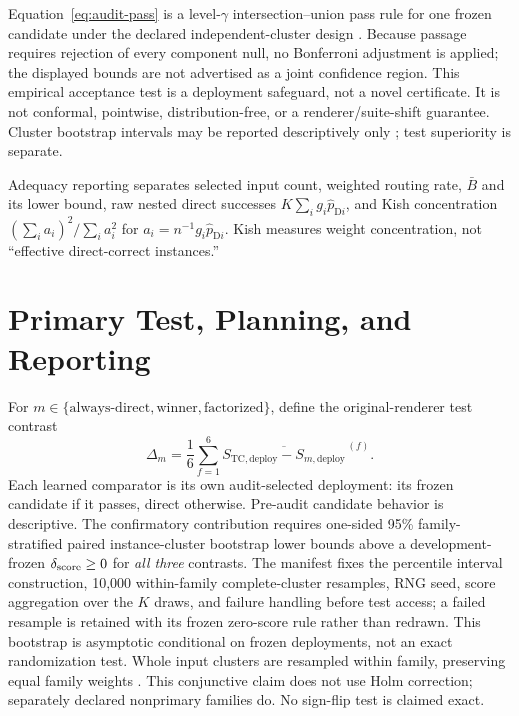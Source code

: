 \documentclass{article}
\newcommand{\D}{\ensuremath{\mathrm{D}}}
\newcommand{\1}{\mathbb{I}}
\begin{document}
Equation~\ref{eq:audit-pass} is a level-$\gamma$ intersection--union pass rule for one frozen candidate under the declared independent-cluster design \citep{berger1996bioequivalence}. Because passage requires rejection of every component null, no Bonferroni adjustment is applied; the displayed bounds are not advertised as a joint confidence region. This empirical acceptance test is a deployment safeguard, not a novel certificate. It is not conformal, pointwise, distribution-free, or a renderer/suite-shift guarantee. Cluster bootstrap intervals may be reported descriptively only \citep{field2007bootstrapping}; test superiority is separate.

Adequacy reporting separates selected input count, weighted routing rate, $\bar B$ and its lower bound, raw nested direct successes $K\sum_i g_i\widehat p_{\D i}$, and Kish concentration $(\sum_i a_i)^2/\sum_i a_i^2$ for $a_i=n^{-1}g_i\widehat p_{\D i}$. Kish measures weight concentration, not ``effective direct-correct instances.''

\section{Primary Test, Planning, and Reporting}
For $m\in\{\text{always-direct},\text{winner},\text{factorized}\}$, define the original-renderer test contrast
\begin{equation}
 \Delta_m=\frac16\sum_{f=1}^6
 \overline{S_{\mathrm{TC,deploy}}-S_{m,\mathrm{deploy}}}^{\,(f)}.
 \label{eq:primary}
\end{equation}
Each learned comparator is its own audit-selected deployment: its frozen candidate if it passes, direct otherwise. Pre-audit candidate behavior is descriptive. The confirmatory contribution requires one-sided 95\% family-stratified paired instance-cluster bootstrap lower bounds above a development-frozen $\delta_{\rm score}\geq0$ for \emph{all three} contrasts. The manifest fixes the percentile interval construction, 10,000 within-family complete-cluster resamples, RNG seed, score aggregation over the $K$ draws, and failure handling before test access; a failed resample is retained with its frozen zero-score rule rather than redrawn. This bootstrap is asymptotic conditional on frozen deployments, not an exact randomization test. Whole input clusters are resampled within family, preserving equal family weights \citep{field2007bootstrapping}. This conjunctive claim does not use Holm correction; separately declared nonprimary families do. No sign-flip test is claimed exact.
\end{document}
